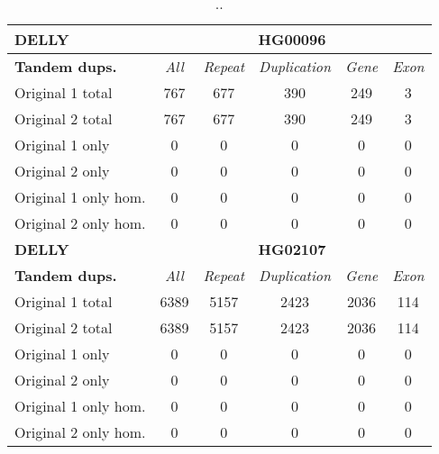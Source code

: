\begin{table}[htb]
\caption{ .. }
\begin{center}
\begin{tabular}{|l|c||c|c|c|c|}
\hline
{\bf DELLY} & \multicolumn{5}{|c|}{\bf HG00096} \\
\hline
\cline{2-6}
{\bf Tandem dups.} & {\it All} & {\it Repeat} & {\it Duplication} & {\it Gene} & {\it Exon} \\
\hline
Original 1 total & 767 & 677 & 390 & 249 & 3\\ 
\hline
Original 2 total & 767 & 677 & 390 & 249 & 3\\ 
\hline
Original 1 only & 0 & 0 & 0 & 0 & 0\\ 
\hline
Original 2 only & 0 & 0 & 0 & 0 & 0\\ 
\hline
Original 1 only hom. & 0 & 0 & 0 & 0 & 0\\ 
\hline
Original 2 only hom. & 0 & 0 & 0 & 0 & 0\\ 
\hline
\hline
{\bf DELLY} & \multicolumn{5}{|c|}{\bf HG02107} \\
\hline
\cline{2-6}
{\bf Tandem dups.} & {\it All} & {\it Repeat} & {\it Duplication} & {\it Gene} & {\it Exon} \\
\hline
Original 1 total & 6389 & 5157 & 2423 & 2036 & 114\\ 
\hline
Original 2 total & 6389 & 5157 & 2423 & 2036 & 114\\ 
\hline
Original 1 only & 0 & 0 & 0 & 0 & 0\\ 
\hline
Original 2 only & 0 & 0 & 0 & 0 & 0\\ 
\hline
Original 1 only hom. & 0 & 0 & 0 & 0 & 0\\ 
\hline
Original 2 only hom. & 0 & 0 & 0 & 0 & 0\\ 
\hline
\end{tabular}
\end{center}
\label{tab:orig-vs-orig2-delly-dups}
\end{table}


